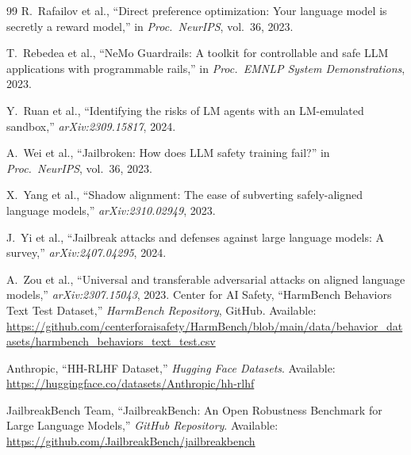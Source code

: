 \documentclass[conference]{IEEEtran}
\begin{document}
\begin{thebibliography}{99}
R.\ Rafailov et al., ``Direct preference optimization: Your language model is
secretly a reward model,'' in \textit{Proc.\ NeurIPS}, vol.\ 36, 2023.

T.\ Rebedea et al., ``NeMo Guardrails: A toolkit for controllable and safe LLM
applications with programmable rails,''
in \textit{Proc.\ EMNLP System Demonstrations}, 2023.

Y.\ Ruan et al., ``Identifying the risks of LM agents with an LM-emulated
sandbox,'' \textit{arXiv:2309.15817}, 2024.

A.\ Wei et al., ``Jailbroken: How does LLM safety training fail?''
in \textit{Proc.\ NeurIPS}, vol.\ 36, 2023.

X.\ Yang et al., ``Shadow alignment: The ease of subverting safely-aligned
language models,'' \textit{arXiv:2310.02949}, 2023.

J.\ Yi et al., ``Jailbreak attacks and defenses against large language models:
A survey,'' \textit{arXiv:2407.04295}, 2024.

A.\ Zou et al., ``Universal and transferable adversarial attacks on aligned
language models,'' \textit{arXiv:2307.15043}, 2023.
Center for AI Safety, ``HarmBench Behaviors Text Test Dataset,''
\textit{HarmBench Repository}, GitHub. Available:
\url{https://github.com/centerforaisafety/HarmBench/blob/main/data/behavior_datasets/harmbench_behaviors_text_test.csv}


Anthropic, ``HH-RLHF Dataset,''
\textit{Hugging Face Datasets}. Available:
\url{https://huggingface.co/datasets/Anthropic/hh-rlhf}


JailbreakBench Team, ``JailbreakBench: An Open Robustness Benchmark for
Large Language Models,''
\textit{GitHub Repository}. Available:
\url{https://github.com/JailbreakBench/jailbreakbench}


\end{thebibliography}
\end{document}

